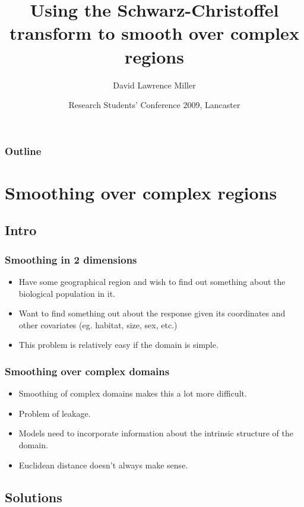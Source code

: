 \documentclass[ignorenonframetext]{beamer} %
\title[Smoothing over complex regions]{Using the Schwarz-Christoffel transform to smooth over complex regions}
\author[Miller]{David Lawrence Miller}
\institute{Mathematical Sciences\\University of Bath}
\date[24 March 2009] {Research Students' Conference 2009, Lancaster}
\newcommand{\bc}{\begin{center}}
\newcommand{\ec}{\end{center}}
\newcommand{\bi}{\begin{itemize}}
\newcommand{\ei}{\end{itemize}}
\begin{document}
\begin{frame}
  \titlepage
\end{frame}


 {
\begin{frame}
  \frametitle{Outline}
  \tableofcontents %
\end{frame}
}

\section{Smoothing over complex regions}

\subsection{Intro}

\begin{frame}
	\frametitle{Smoothing in 2 dimensions}
       \bi
         \item Have some geographical region and wish to find out something about the biological population in it. 
         \item Want to find something out about the response given its coordinates and other covariates (eg. habitat, size, sex, etc.) 
         \item This problem is relatively easy if the domain is simple.
        \ei
        \bc

       \ec
\end{frame}

\begin{frame}
	\frametitle{Smoothing over complex domains}
       \bi
         \item Smoothing of complex domains makes this a lot more difficult.
         \item Problem of leakage.
         \item Models need to incorporate information about the intrinsic structure of the domain.
         \item Euclidean distance doesn't always make sense.
       \ei
\end{frame}

\subsection{Solutions}
\end{document}
